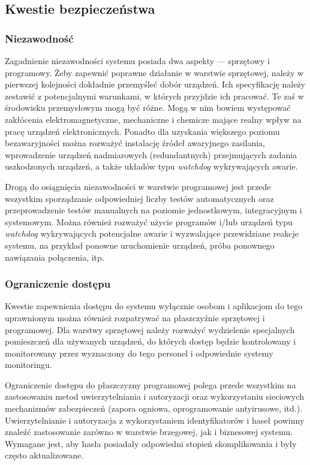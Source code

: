 \documentclass[a4paper, 12pt, twoside]{article}
\begin{document}
\subsection{Kwestie bezpieczeństwa}

\subsubsection{Niezawodność}

Zagadnienie niezawodności systemu posiada dwa aspekty --- sprzętowy i programowy.
Żeby zapewnić poprawne działanie w warstwie sprzętowej, należy w pierwszej 
kolejności dokładnie przemyśleć dobór urządzeń. Ich specyfikację należy zestawić
z potencjalnymi warunkami, w których przyjdzie ich pracować. Te zaś w środowisku
przemysłowym mogą być różne. Mogą w nim bowiem występować zakłócenia elektromagnetyczne,
mechaniczne i chemicze mające realny wpływ na pracę urządzeń elektronicznych.
Ponadto dla uzyskania większego poziomu bezawaryjności można rozważyć 
instalację źródeł awaryjnego zasilania, wprowadzenie urządzeń nadmiarowych (redundantnych)
przejmujących zadania uszkodzonych urządzeń, a także układów typu \emph{watchdog}
wykrywających awarie.

Drogą do osiągnięcia niezawodności w warstwie programowej jest przede wszystkim sporządzanie
odpowiedniej liczby testów automatycznych oraz przeprowadzenie testów manualnych
na poziomie jednostkowym, integracyjnym i systemowym. 
Można również rozważyć użycie programów i/lub urządzeń typu \emph{watchdog}
wykrywających potencjalne awarie i wyzwalające przewidziane reakcje systemu,
na przyklad ponowne uruchomienie urządzeń, próba ponownego nawiązania połączenia, itp. 

\subsubsection{Ograniczenie dostępu}

Kwestie zapewnienia dostępu do systemu wyłącznie osobom i aplikacjom do tego 
uprawnionym można również rozpatrywać na płaszczyźnie sprzętowej i programowej.
Dla warstwy sprzętowej należy rozważyć wydzielenie specjalnych pomieszczeń 
dla używanych urządzeń, do których dostęp będzie kontrolowany i monitorowany 
przez wyznaczony do tego personel i odpowiednie systemy monitoringu. 

Ograniczenie dostępu do płaszczyzny programowej polega przede wszystkim na zastosowaniu
metod uwierzytelniania i autoryzacji oraz wykorzystaniu sieciowych mechanizmów zabezpieczeń 
(zapora ogniowa, oprogramowanie antyirusowe, itd.). Uwierzytelnianie i autoryzacja z wykorzystaniem
identyfikatorów i haseł powinny znaleźć zastosowanie zarówno w warstwie brzegowej,
jak i biznesowej systemu. Wymagane jest, aby hasła posiadały odpowiedni stopień skomplikowania
i były często aktualizowane.
\end{document}
